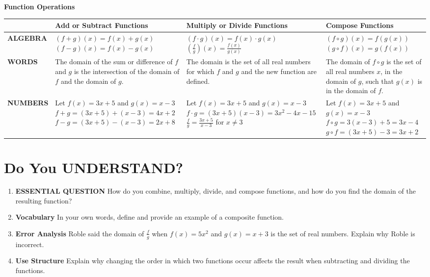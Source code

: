 \documentclass{article}
\newenvironment{concept-summary}{}{}
\begin{document}
\begin{concept-summary}
\textbf{Function Operations}

\begin{tabular}{p{1.5cm} p{4cm} p{4cm} p{4cm}}
\toprule
& \textbf{Add or Subtract Functions} & \textbf{Multiply or Divide Functions} & \textbf{Compose Functions} \\
\midrule
\textbf{ALGEBRA} & 
$(f + g)(x) = f(x) + g(x)$ \newline
$(f - g)(x) = f(x) - g(x)$ & 
$(f \cdot g)(x) = f(x) \cdot g(x)$ \newline
$\left(\frac{f}{g}\right)(x) = \frac{f(x)}{g(x)}$ & 
$(f \circ g)(x) = f(g(x))$ \newline
$(g \circ f)(x) = g(f(x))$ \\
\midrule
\textbf{WORDS} & 
The domain of the sum or difference of $f$ and $g$ is the intersection of the domain of $f$ and the domain of $g$. & 
The domain is the set of all real numbers for which $f$ and $g$ and the new function are defined. & 
The domain of $f \circ g$ is the set of all real numbers $x$, in the domain of $g$, such that $g(x)$ is in the domain of $f$. \\
\midrule
\textbf{NUMBERS} & 
Let $f(x) = 3x + 5$ \newline
and $g(x) = x - 3$ \newline
$f + g = (3x + 5) + (x - 3) = 4x + 2$ \newline
$f - g = (3x + 5) - (x - 3) = 2x + 8$ & 
Let $f(x) = 3x + 5$ \newline
and $g(x) = x - 3$ \newline
$f \cdot g = (3x + 5)(x - 3) = 3x^2 - 4x - 15$ \newline
$\frac{f}{g} = \frac{3x + 5}{x - 3}$ for $x \neq 3$ & 
Let $f(x) = 3x + 5$ \newline
and $g(x) = x - 3$ \newline
$f \circ g = 3(x - 3) + 5 = 3x - 4$ \newline
$g \circ f = (3x + 5) - 3 = 3x + 2$ \\
\bottomrule
\end{tabular}
\end{concept-summary}

\section*{Do You UNDERSTAND?}
\begin{enumerate}
\item \textbf{ESSENTIAL QUESTION} How do you combine, multiply, divide, and compose functions, and how do you find the domain of the resulting function?
\item \textbf{Vocabulary} In your own words, define and provide an example of a composite function.
\item \textbf{Error Analysis} Roble said the domain of $\frac{f}{g}$ when $f(x) = 5x^2$ and $g(x) = x + 3$ is the set of real numbers. Explain why Roble is incorrect.
\item \textbf{Use Structure} Explain why changing the order in which two functions occur affects the result when subtracting and dividing the functions.
\end{enumerate}
\end{document}
